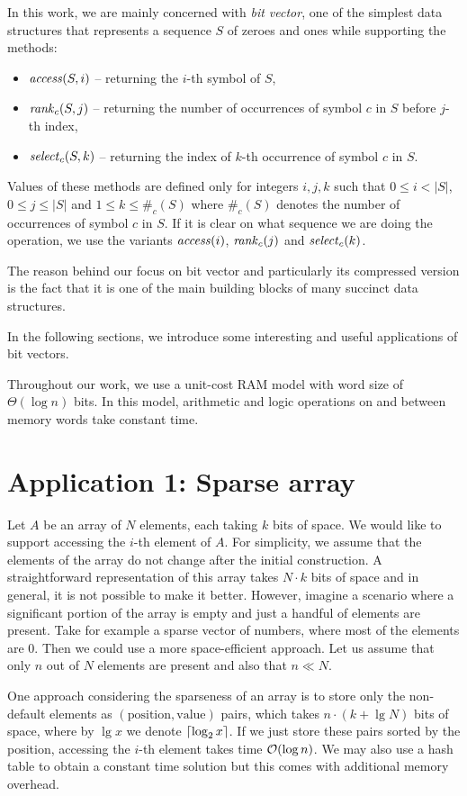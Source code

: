 In this work, we are mainly concerned with \textit{bit vector}, one of the simplest
data structures that represents a sequence $S$ of zeroes and ones while supporting the
methods:
\begin{itemize}
	\item $\mathit{access}(S, i)$ -- returning the $i$-th symbol of $S$,
	\item $\mathit{rank}_c(S, j)$ -- returning the number of occurrences of symbol $c$ in $S$ before $j$-th index,
	\item $\mathit{select}_c(S, k)$ -- returning the index of $k$-th occurrence of symbol $c$ in $S$.
\end{itemize}
Values of these methods are defined only for integers $i, j, k$ such that $0\leq i<|S|$, $0\leq j\leq |S|$
and $1\leq k\leq \#_c(S)$ where $\#_c(S)$ denotes the number of occurrences of symbol $c$ in $S$. If it is
clear on what sequence we are doing the operation, we use the variants $\mathit{access}(i)$, $\mathit{rank}_c(j)$ and $\mathit{select}_c(k)$.

The reason behind our focus on bit vector and particularly its compressed version
is the fact that it is one of the main building blocks of many succinct data structures.

In the following sections, we introduce some interesting and useful applications of bit vectors.

Throughout our work, we use a unit-cost RAM model with word size of $\Theta(\log n)$ bits.
In this model, arithmetic and logic operations on and between memory words take constant time.

\section{Application 1: Sparse array}

Let $A$ be an array of $N$ elements, each taking $k$ bits of space. We would like
to support accessing the $i$-th element of $A$. For simplicity, we assume that
the elements of the array do not change after the initial construction. A straightforward
representation of this array takes $N\cdot k$ bits of space and in general, it is not
possible to make it better. However, imagine a scenario where a significant portion
of the array is empty and just a handful of elements are present. Take for example a
sparse vector of numbers, where most of the elements are 0. Then we could use a more
space-efficient approach. Let us assume that only $n$ out of $N$ elements are present
and also that $n\ll N$.

One approach considering the sparseness of an array is to store only the non-default
elements as $(\text{position}, \text{value})$ pairs, which takes $n\cdot (k+\lg N)$
bits of space, where by $\lg x$ we denote $\left\lceil \log_2 x \right\rceil$. If we just store these
pairs sorted by the position, accessing the $i$-th element takes time $\mathcal{O}(\log n)$.
We may also use a hash table to obtain a constant time solution but this comes with
additional memory overhead.


